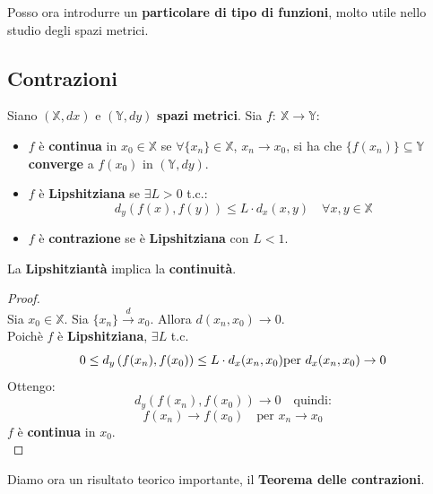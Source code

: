 \documentclass[a4paper, oneside]{article}
\newcommand\X{\mathbb{X}}
\newcommand\Y{\mathbb{Y}}
\begin{document}
\noindent Posso ora introdurre un \textbf{particolare di tipo di funzioni}, molto utile nello studio degli spazi metrici. 

\subsection{Contrazioni}
Siano $(\X,dx)$ e $(\Y,dy)$ \textbf{spazi metrici}. Sia $f: \ \X\to\Y$:
\begin{itemize}
    \item $f$ è \textbf{continua} in $x_0\in\X$ se $\forall \{x_n\}\in\X$, $x_n\to x_0$, si ha che $\{f(x_n)\}\subseteq\Y$
    \textbf{converge} a $f(x_0)$ in $(\Y,dy)$.
    \item $f$ è \textbf{Lipshitziana} se $\exists L>0$ t.c.:
    \[d_y\left(f(x),f(y)\right) \leq L\cdot d_x(x,y) \quad \forall x,y\in\X\]
    \item $f$ è \textbf{contrazione} se è \textbf{Lipshitziana} con $L< 1$.
\end{itemize}

\begin{proposition}
    La \textbf{Lipshitziantà} implica la \textbf{continuità}.

    \begin{proof}\hfill\\
        Sia $x_0\in\X$. Sia $\{x_n\}\overset{d}{\longrightarrow}x_0$. Allora $d(x_n,x_0)\to0$.\\
        Poichè $f$ è \textbf{Lipshitziana}, $\exists L$ t.c.
        \[0\leq d_y\left(f(x_n),f(x_0)\right) \leq L\cdot d_x(x_n,x_0)\\
        \text{per} \ d_x(x_n,x_0)\to0\]
        Ottengo:
        \[d_y\left(f(x_n),f(x_0)\right)\to 0\quad \text{quindi:}\]
        \[f(x_n)\to f(x_0) \quad \text{per } x_n \to x_0\]
        $f$ è \textbf{continua} in $x_0$.\\
    \end{proof}
\end{proposition}
\noindent
Diamo ora un risultato teorico importante, il \textbf{Teorema delle contrazioni}.
\end{document}
